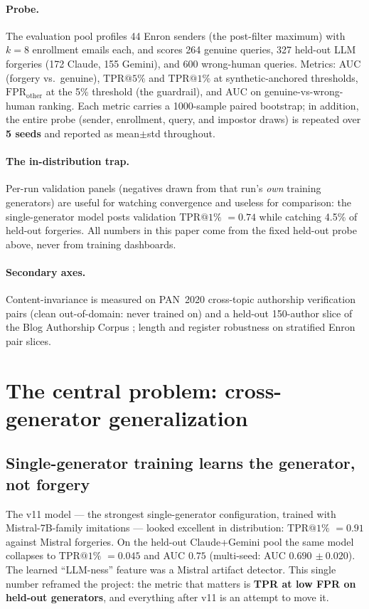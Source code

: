 \documentclass[11pt]{article}
\makeatletter
\newcommand{\fprother}{\ensuremath{\mathrm{FPR}_{\mathrm{other}}}}
\newcommand{\tprat}[1]{\ensuremath{\mathrm{TPR}@#1\%}}
\newcommand{\ms}[2]{\ensuremath{#1{\scriptstyle\,\pm #2}}}
\makeatother
\begin{document}
\paragraph{Probe.} The evaluation pool profiles 44 Enron senders (the post-filter maximum) with
$k{=}8$ enrollment emails each, and scores 264 genuine queries, 327 held-out LLM forgeries
(172 Claude, 155 Gemini), and 600 wrong-human queries. Metrics: AUC (forgery vs.\ genuine),
\tprat{5} and \tprat{1} at synthetic-anchored thresholds, \fprother{} at the 5\% threshold
(the guardrail), and AUC on genuine-vs-wrong-human ranking. Each metric carries a 1000-sample
paired bootstrap; in addition, the entire probe (sender, enrollment, query, and impostor draws) is
repeated over \textbf{5 seeds} and reported as mean$\pm$std throughout.

\paragraph{The in-distribution trap.} Per-run validation panels (negatives drawn from that run's
\emph{own} training generators) are useful for watching convergence and useless for comparison:
the single-generator model posts validation \tprat{1} $= 0.74$ while catching 4.5\% of held-out
forgeries. All numbers in this paper come from the fixed held-out probe above, never from training
dashboards.

\paragraph{Secondary axes.} Content-invariance is measured on PAN~2020 cross-topic authorship
verification pairs \citep{kestemont2020} (clean out-of-domain: never trained on) and a held-out
150-author slice of the Blog Authorship Corpus \citep{schler2006}; length and register robustness
on stratified Enron pair slices.

\section{The central problem: cross-generator generalization}
\label{sec:gap}

\subsection{Single-generator training learns the generator, not forgery}
\label{sec:v11collapse}
The v11 model --- the strongest single-generator configuration, trained with Mistral-7B-family
imitations --- looked excellent in distribution: \tprat{1} $= 0.91$ against Mistral forgeries. On
the held-out Claude+Gemini pool the same model collapses to \tprat{1} $= 0.045$ and AUC $0.75$
(multi-seed: AUC \ms{0.690}{0.020}). The learned ``LLM-ness'' feature was a Mistral artifact
detector. This single number reframed the project: the metric that matters is
\textbf{TPR at low FPR on held-out generators}, and everything after v11 is an attempt to move it.
\end{document}
